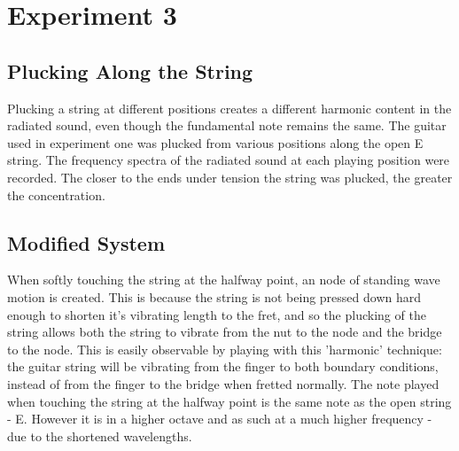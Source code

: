 \documentclass[11pt]{article}
\begin{document}
    \section{Experiment 3}
        \subsection{Plucking Along the String}
            Plucking a string at different positions creates a different harmonic content in the radiated sound, even though the fundamental note remains the same.
            The guitar used in experiment one was plucked from various positions along the open E string.
            The frequency spectra of the radiated sound at each playing position were recorded.
            The closer to the ends under tension the string was plucked, the greater the concentration.
        \subsection{Modified System}
            When softly touching the string at the halfway point, an node of standing wave motion is created.
            This is because the string is not being pressed down hard enough to shorten it's vibrating length to the fret, and so the plucking of the string allows both the string to vibrate from the nut to the node and the bridge to the node. \cite{PHYS15}
            This is easily observable by playing with this 'harmonic' technique: the guitar string will be vibrating from the finger to both boundary conditions, instead of from the finger to the bridge when fretted normally.
            The note played when touching the string at the halfway point is the same note as the open string - E.
            However it is in a higher octave and as such at a much higher frequency - due to the shortened wavelengths.
\end{document}
